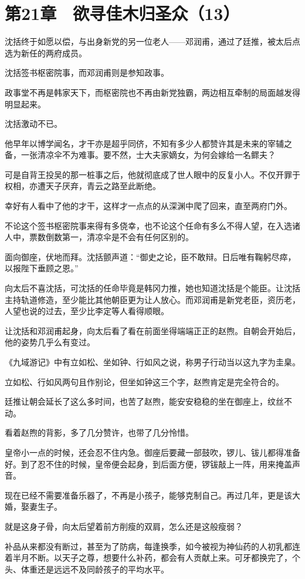\section{第21章　欲寻佳木归圣众（13）}

沈括终于如愿以偿，与出身新党的另一位老人——邓润甫，通过了廷推，被太后点选为新任的两府成员。

沈括签书枢密院事，而邓润甫则是参知政事。

政事堂不再是韩家天下，而枢密院也不再由新党独霸，两边相互牵制的局面越发得明显起来。

沈括激动不已。

他早年以博学闻名，才干亦是超乎同侪，不知有多少人都赞许其是未来的宰辅之备，一张清凉伞不为难事。要不然，士大夫家嫡女，为何会嫁给一名鳏夫？

可是自背王投吴的那一桩事之后，他就彻底成了世人眼中的反复小人。不仅开罪于权相，亦遭天子厌弃，青云之路至此断绝。

幸好有人看中了他的才干，这样才一点点的从深渊中爬了回来，直至两府门外。

不论这个签书枢密院事来得有多侥幸，也不论这个任命有多么不得人望，在入选诸人中，票数倒数第一，清凉伞是不会有任何区别的。

面向御座，伏地而拜。沈括颤声道：“御史之论，臣不敢辩。日后唯有鞠躬尽瘁，以报陛下垂顾之恩。”

向太后不喜沈括，可沈括的任命毕竟是韩冈力推，她也知道沈括是个能臣。让沈括主持轨道修造，至少能比其他朝臣更为让人放心。而邓润甫是新党老臣，资历老，人望也说的过去，至少比李定等人看得顺眼。

让沈括和邓润甫起身，向太后看了看在前面坐得端端正正的赵煦。自朝会开始后，他的姿势几乎么有变过。

《九域游记》中有立如松、坐如钟、行如风之说，称男子行动当以这九字为圭臬。

立如松、行如风两句且作别论，但坐如钟这三个字，赵煦肯定是完全符合的。

廷推让朝会延长了这么多时间，也苦了赵煦，能安安稳稳的坐在御座上，纹丝不动。

看着赵煦的背影，多了几分赞许，也带了几分怜惜。

皇帝小一点的时候，还会忍不住内急。御座后要藏一部鼓吹，锣儿、钹儿都得准备好。到了忍不住的时候，皇帝便会起身，到后面方便，锣钹敲上一阵，用来掩盖声音。

现在已经不需要准备乐器了，不再是小孩子，能够克制自己。再过几年，更是该大婚，娶妻生子。

就是这身子骨，向太后望着前方削瘦的双肩，怎么还是这般瘦弱？

补品从来都没有断过，甚至为了防病，每逢换季，如今被视为神仙药的人初乳都连着半月不断。以天子之尊，想要什么补药，都会有人贡献上来。可牙都换完了，个头、体重还是远远不及同龄孩子的平均水平。

